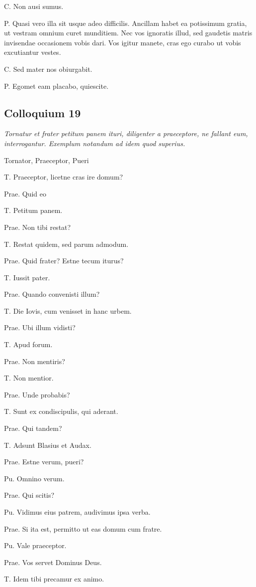 \documentclass{article}
\begin{document}
C. Non ausi sumus.

P. Quasi vero illa sit usque adeo difficilis. Ancillam habet ea potissimum gratia, ut vestram omnium curet munditiem. Nec vos ignoratis illud, sed gaudetis matris invisendae occasionem vobis dari. Vos igitur manete, cras ego curabo ut vobis excutiantur vestes.

C. Sed mater nos obiurgabit.

P. Egomet eam placabo, quiescite.

\subsection{Colloquium 19}
\emph{Tornatur et frater petitum panem ituri, diligenter a praeceptore, ne fallant eum, interrogantur. Exemplum notandum ad idem quod superius.}

Tornator, Praeceptor, Pueri

T. Praeceptor, licetne cras ire domum?

Prae. Quid eo

T. Petitum panem.

Prae. Non tibi restat?

T. Restat quidem, sed parum admodum.

Prae. Quid frater? Estne tecum iturus?

T. Iussit pater.

Prae. Quando convenisti illum?

T. Die Iovis, cum venisset in hanc urbem.

Prae. Ubi illum vidisti?

T. Apud forum.

Prae. Non mentiris?

T. Non mentior.

Prae. Unde probabis?

T. Sunt ex condiscipulis, qui aderant.

Prae. Qui tandem?

T. Adsunt Blasius et Audax.

Prae. Estne verum, pueri?

Pu. Omnino verum.

Prae. Qui scitis?

Pu. Vidimus eius patrem, audivimus ipsa verba.

Prae. Si ita est, permitto ut eas domum cum fratre.

Pu. Vale praeceptor.

Prae. Vos servet Dominus Deus.

T. Idem tibi precamur ex animo.
\end{document}
